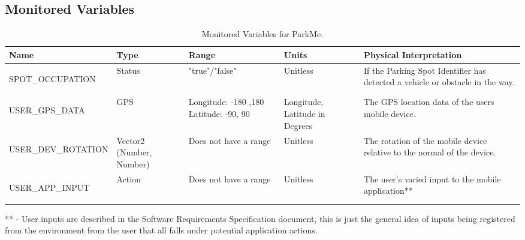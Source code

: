 \documentclass[]{article}
\begin{document}
	\subsection{Monitored Variables}
	\begin{table}[H]
		\begin{tabular}{ | m{4cm} | m{1.5cm}| m{2cm}| m{3cm}| m{3cm} |} 
			\hline
			Name & Type & Range & Units & Physical Interpretation \\ [0.5ex] 
			\hline
			\hypertarget{SPOCC}{SPOT\_OCCUPATION} & Status & "true"/"false" & Unitless & If the Parking Spot Identifier has detected a vehicle or obstacle in the way. \\ 
			\hline
			\hypertarget{UGPSDT}{USER\_GPS\_DATA} & GPS & Longitude: -180 ,180
			Latitude: -90, 90
			& Longitude, Latitude in Degrees & The GPS location data of the users mobile device. \\ 
			\hline 
			\hypertarget{UDVCROT}{USER\_DEV\_ROTATION} & Vector2 (Number, Number) & Does not have a range & Unitless & The rotation of the mobile device relative to the normal of the device. \\
			\hline
			\hypertarget{UAIN}{USER\_APP\_INPUT} & Action & Does not have a range & Unitless & The user’s varied input to the mobile application** \\	
			\hline
		\end{tabular}
		\caption{Monitored Variables for ParkMe.}
		** - User inputs are described in the Software Requirements Specification document, this is just the general idea of inputs being registered from the environment from the user that all falls under potential application actions.
	\end{table}
	
\end{document}
